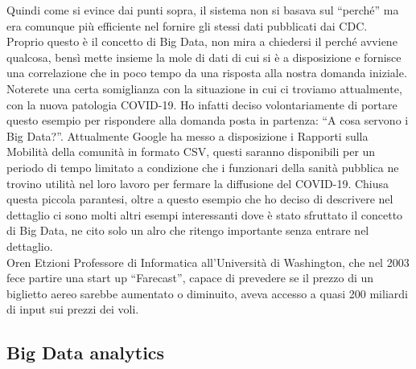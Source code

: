 Quindi come si evince dai punti sopra, il sistema non si basava sul ``perch\'e'' ma era comunque pi\`u efficiente nel fornire gli stessi dati pubblicati dai CDC.\\
Proprio questo \`e il concetto di Big Data, non mira a chiedersi il perch\'e avviene qualcosa, bens\`i mette insieme la mole di dati di cui si \`e a disposizione e fornisce una correlazione che in poco tempo da una risposta alla nostra domanda iniziale.\\
Noterete una certa somiglianza con la situazione in cui ci troviamo attualmente, con la nuova patologia COVID-19. Ho infatti deciso volontariamente di portare questo esempio per rispondere alla domanda posta in partenza: ``A cosa servono i Big Data?''. Attualmente Google ha messo a disposizione i Rapporti sulla Mobilit\`a della comunit\`a in formato CSV, questi saranno disponibili per un periodo di tempo limitato a condizione che i funzionari della sanit\`a pubblica ne trovino utilit\`a nel loro lavoro per fermare la diffusione del COVID-19. Chiusa questa piccola parantesi, oltre a questo esempio che ho deciso di descrivere nel dettaglio ci sono molti altri esempi interessanti dove \`e stato sfruttato il concetto di Big Data, ne cito solo un alro che ritengo importante senza entrare nel dettaglio.\\
Oren Etzioni Professore di Informatica all'Universit\`a di Washington, che nel 2003 fece partire una start up ``Farecast'', capace di prevedere se il prezzo di un biglietto aereo sarebbe aumentato o diminuito, aveva accesso a quasi 200 miliardi di input sui prezzi dei voli.

\subsection{Big Data analytics}

